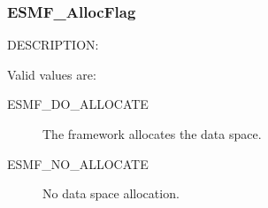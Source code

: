 
\subsubsection{ESMF\_AllocFlag}
 
{\sf DESCRIPTION:\\}


Valid values are:
\begin{description}
   \item [ESMF\_DO\_ALLOCATE]
         The framework allocates the data space.
   \item [ESMF\_NO\_ALLOCATE]
         No data space allocation.
\end{description}



